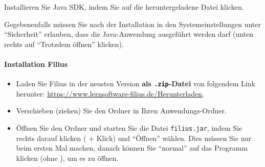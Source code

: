 Installieren Sie Java SDK, indem Sie auf die heruntergeladene Datei klicken.

Gegebenenfalls müssen Sie nach der Installation in den Systemeinstellungen unter \enquote{Sicherheit} erlauben, dass die Java-Anwendung ausgeführt werden darf (unten rechts auf \enquote{Trotzdem öffnen} klicken).

\paragraph*{Installation Filius}

\begin{itemize}
	\item Laden Sie Filius in der neusten Version \textbf{als \texttt{.zip}-Datei} von folgendem Link herunter: \url{https://www.lernsoftware-filius.de/Herunterladen}.
	\item Verschieben (ziehen) Sie den Ordner in Ihren Anwendungs-Ordner.
	\item Öffnen Sie den Ordner und starten Sie die Datei \texttt{filius.jar}, indem Sie rechts darauf klicken (\keys{\Alt} + Klick) und \enquote{Öffnen} wählen. Dies müssen Sie nur beim ersten Mal machen, danach können Sie \enquote{normal} auf das Programm klicken (ohne \keys{\Alt}), um es zu öffnen.
\end{itemize}